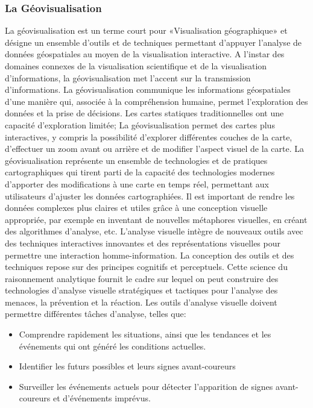 \documentclass[french, a4paper, 12pt]{report}
\begin{document}
\subsubsection{La Géovisualisation}
La géovisualisation est un terme court pour «Visualisation géographique» et désigne un ensemble d’outils et de techniques permettant d’appuyer l’analyse de données géospatiales au moyen de la visualisation interactive. A l'instar des domaines connexes de la visualisation scientifique et de la visualisation d'informations, la géovisualisation met l'accent sur la transmission d'informations. La géovisualisation communique les informations géospatiales d'une manière qui, associée à la compréhension humaine, permet l'exploration des données et la prise de décisions. Les cartes statiques traditionnelles ont une capacité d'exploration limitée; La géovisualisation permet des cartes plus interactives, y compris la possibilité d'explorer différentes couches de la carte, d'effectuer un zoom avant ou arrière et de modifier l'aspect visuel de la carte. La géovisualisation représente un ensemble de technologies et de pratiques cartographiques qui tirent parti de la capacité des technologies modernes d’apporter des modifications à une carte en temps réel, permettant aux utilisateurs d’ajuster les données cartographiées. Il est important de rendre les données complexes plus claires et utiles grâce à une conception visuelle appropriée, par exemple en inventant de nouvelles métaphores visuelles, en créant des algorithmes d'analyse, etc.
L'analyse visuelle intègre de nouveaux outils avec des techniques interactives innovantes et des représentations visuelles pour permettre une interaction homme-information. La conception des outils et des techniques repose sur des principes cognitifs et perceptuels. Cette science du raisonnement analytique fournit le cadre sur lequel on peut construire des technologies d'analyse visuelle stratégiques et tactiques pour l'analyse des menaces, la prévention et la réaction.
Les outils d'analyse visuelle doivent permettre différentes tâches d'analyse, telles que:
\begin{itemize}
\item Comprendre rapidement les situations, ainsi que les tendances et les événements qui ont généré les conditions actuelles.
\item Identifier les futurs possibles et leurs signes avant-coureurs
\item Surveiller les événements actuels pour détecter l'apparition de signes avant-coureurs et d'événements imprévus.
\end{itemize}
\end{document}
